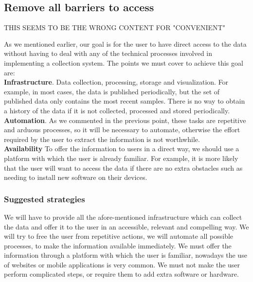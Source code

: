 \subsection{Remove all barriers to access}

THIS SEEMS TO BE THE WRONG CONTENT FOR "CONVENIENT"

As we mentioned earlier, our goal is for the user to have direct access to the data without having to deal with any
of the technical processes involved in implementing a collection system. The points we must cover to achieve this goal are: \\

\textbf{Infrastructure}. Data collection, processing, storage and visualization. For example, in most cases, the data is
published periodically, but the set of published data only contains the most recent samples. There is no way to obtain
a history of the data if it is not collected, processed and stored periodically. \\

\textbf{Automation}. As we commented in the previous point, these tasks are repetitive and arduous processes, so it will be
necessary to automate, otherwise the effort required by the user to extract the information is not worthwhile. \\

\textbf{Availability} To offer the information to users in a direct way, we should use a platform with which the user is already 
familiar. For example, it is more likely that the user will want to access the data if there are no extra obstacles such as needing 
to install new software on their devices. \\

\subsubsection*{Suggested strategies} 

We will have to provide all the afore-mentioned infrastructure which can collect the data and offer it to the user in an accessible, relevant and compelling way.
We will try to free the user from repetitive actions, we will automate all possible processes, to make the information available immediately.
We must offer the information through a platform with which the user is familiar, nowadays the use of websites or mobile applications is very common.
We must not make the user perform complicated steps, or require them to add extra software or hardware.

